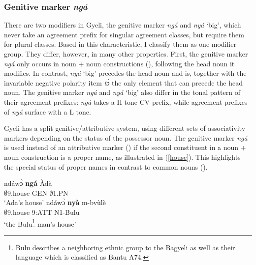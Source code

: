 \subsubsection{Genitive marker {\itshape ngá}}
There are two modifiers in Gyeli, the genitive marker {\itshape ngá} and {\itshape nyá} `big', which never take an agreement prefix for singular agreement classes, but require them for plural classes.%
Based in this characteristic, I classify them as one modifier group. They differ, however, in many other properties. First, the genitive marker {\itshape ngá} only occurs in noun + noun constructions (), following the head noun it modifies. In contrast, {\itshape nyá} `big' precedes the head noun and is, together with the invariable negative polarity item {\itshape tɔ̀} the only element that can precede the head noun. The genitive marker {\itshape ngá} and {\itshape nyá} `big' also differ in the tonal pattern of their agreement prefixes: {\itshape ngá} takes a H tone CV prefix, while agreement prefixes of {\itshape nyá} surface with a L tone. 
\label{sec:GEN}

Gyeli has a split genitive/attributive system, using different sets of associativity markers depending on the status of the possessor noun. 
The genitive marker {\itshape ngá} is used instead of an attributive marker () if the second constituent in a noun + noun construction is a proper name, as illustrated in (\ref{house}). This highlights the special status of proper names in contrast to common nouns ().

\begin{exe}
\ex\label{house}
\begin{xlist}
\ex\label{house1}
 \gll    ndáwɔ̀ {\bfseries ngá} Àdà \\
                $\emptyset$9.house GEN $\emptyset$1.PN\\
    \trans `Ada's house'
\ex \label{house2}
  \gll     ndáwɔ̀ {\bfseries nyà} m-bvùlè \\
                $\emptyset$9.house 9:ATT N1-Bulu \\
    \trans `the Bulu\footnote{Bulu describes a neighboring ethnic group to the Bagyeli as well as their language which is classified as Bantu A74.} man's house'
\end {xlist}
\end {exe}

